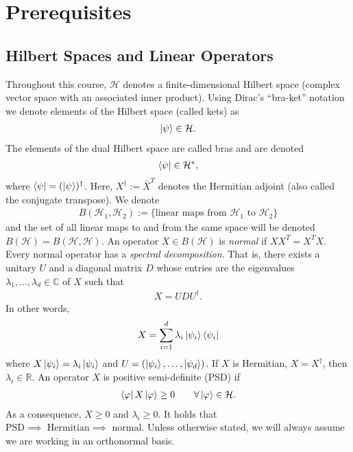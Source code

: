 \documentclass[10pt,oneside,longbibliography]{report}
\begin{document}

\tableofcontents
\newpage

\setcounter{chapter}{-1}
\chapter{Prerequisites}
\section{Hilbert Spaces and Linear Operators}
Throughout this course, $\mathcal{H}$ denotes a finite-dimensional Hilbert space (complex vector space with an associated inner product). Using Dirac's ``bra-ket'' notation we denote elements of the Hilbert space (called kets) as
\begin{align}
    \ket{\psi}\in \mathcal{H}.
\end{align}
The elements of the dual Hilbert space are called bras and are denoted
\begin{align}
    \bra{\psi}\in \mathcal{H}^*,
\end{align}
where $\bra{\psi}=(\ket{\psi})^{\dagger}$. Here, $X^{\dagger}:=\bar{X}^{T}$ denotes the Hermitian adjoint (also called the conjugate transpose). We denote
\begin{align}
    B(\mathcal{H}_1,\mathcal{H}_2) := \{\text{linear maps from $\mathcal{H}_1$ to $\mathcal{H}_2$}\}
\end{align} 
and the set of all linear maps to and from the same space will be denoted $B(\mathcal{H})=B(\mathcal{H},\mathcal{H})$. An operator $X \in B(\mathcal{H})$ is \textit{normal} if $XX^{T}=X^{T}X$. Every normal operator has a \textit{spectral decomposition}. That is, there exists a unitary $U$ and a diagonal matrix $D$ whose entries are the eigenvalues $\lambda_1,\dots,\lambda_d \in \mathbb{C}$ of $X$ such that 
\begin{align}
    X=UDU^{\dagger}.
\end{align}
In other words, 
\begin{align}
    X=\sum_{i=1}^d\lambda_i \ket{\psi_i} \bra{\psi_i}
\end{align}
where $X\ket{\psi_i}=\lambda_i \ket{\psi_i}$ and $U=(\ket{\psi_i},\dots,\ket{\psi_d})$. If $X$ is Hermitian, $X=X^{\dagger}$, then $\lambda_i \in \mathbb{R}$. An operator $X$ is positive semi-definite (PSD) if \begin{align}
    \bra{\varphi} X \ket{\varphi} \geq 0 \quad \quad \forall \ket{\varphi} \in \mathcal{H}.
\end{align}
As a consequence, $X \geq 0$ and $\lambda_i \geq 0$.
It holds that $\text{PSD} \implies \text{ Hermitian} \implies \text{ normal}$. Unless otherwise stated, we will always assume we are working in an orthonormal basis.
\end{document}
